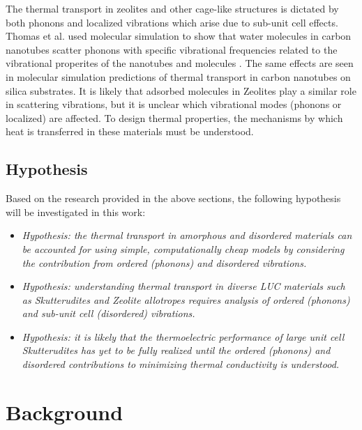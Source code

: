 \documentclass[letterpaper,12pt]{article}
\begin{document}
The thermal transport in zeolites and other cage-like structures is dictated by both phonons\cite{mcgaughey2004b} and localized vibrations which arise due to sub-unit cell effects.\cite{O'Keeffe20003,doi:10.1021/ar000034b} Thomas et al. used molecular simulation to show that water molecules in carbon nanotubes scatter phonons with specific vibrational frequencies related to the vibrational properites of the nanotubes and molecules \cite{thomas2010c}. The same effects are seen in molecular simulation predictions of thermal transport in carbon nanotubes on silica substrates.\cite{shiomi2011b} It is likely that adsorbed molecules in Zeolites play a similar role in scattering vibrations, but it is unclear which vibrational modes (phonons or localized) are affected.\cite{Miyamoto1994117} To design thermal properties, the mechanisms by which heat is transferred in these materials must be understood.
\subsection{\label{S-Motivation-Hypothesis}Hypothesis}
Based on the research provided in the above sections, the following hypothesis will be investigated in this work:
\begin{itemize}
\item \textit{Hypothesis: the thermal transport in amorphous and disordered materials can be accounted for using simple, computationally cheap models by considering the contribution from ordered (phonons) and disordered vibrations.}
\item \textit{Hypothesis: understanding thermal transport in diverse LUC materials such as Skutterudites and Zeolite allotropes requires analysis of ordered (phonons) and sub-unit cell (disordered) vibrations.}
\item \textit{Hypothesis: it is likely that the thermoelectric performance of large unit cell Skutterudites has yet to be fully realized until the ordered (phonons) and disordered contributions to minimizing thermal conductivity is understood.}
\end{itemize}
\clearpage
\section{\label{S-Back}Background}
\end{document}
